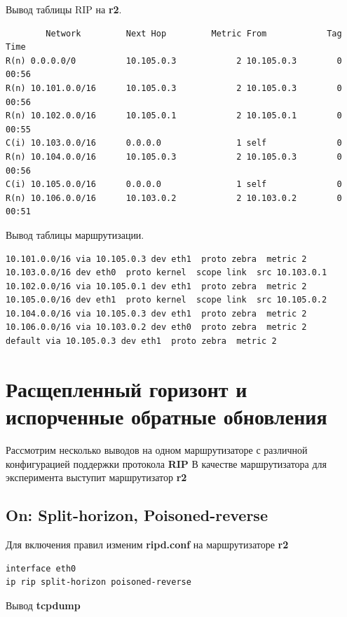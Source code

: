 \documentclass[a4paper,12pt]{article}
\begin{document}
Вывод таблицы RIP на \textbf{r2}.

\begin{Verbatim}
        Network         Next Hop         Metric From            Tag Time
R(n) 0.0.0.0/0          10.105.0.3            2 10.105.0.3        0 00:56
R(n) 10.101.0.0/16      10.105.0.3            2 10.105.0.3        0 00:56
R(n) 10.102.0.0/16      10.105.0.1            2 10.105.0.1        0 00:55
C(i) 10.103.0.0/16      0.0.0.0               1 self              0
R(n) 10.104.0.0/16      10.105.0.3            2 10.105.0.3        0 00:56
C(i) 10.105.0.0/16      0.0.0.0               1 self              0
R(n) 10.106.0.0/16      10.103.0.2            2 10.103.0.2        0 00:51    
\end{Verbatim}

Вывод таблицы маршрутизации.

\begin{Verbatim}
10.101.0.0/16 via 10.105.0.3 dev eth1  proto zebra  metric 2 
10.103.0.0/16 dev eth0  proto kernel  scope link  src 10.103.0.1 
10.102.0.0/16 via 10.105.0.1 dev eth1  proto zebra  metric 2 
10.105.0.0/16 dev eth1  proto kernel  scope link  src 10.105.0.2 
10.104.0.0/16 via 10.105.0.3 dev eth1  proto zebra  metric 2 
10.106.0.0/16 via 10.103.0.2 dev eth0  proto zebra  metric 2 
default via 10.105.0.3 dev eth1  proto zebra  metric 2     
\end{Verbatim}

\section{Расщепленный горизонт и испорченные обратные обновления}

Рассмотрим несколько выводов на одном маршрутизаторе с различной конфигурацией поддержки протокола \textbf{RIP}
В качестве маршрутизатора для эксперимента выступит маршрутизатор \textbf{r2}

\subsection{On: Split-horizon, Poisoned-reverse}
Для включения правил изменим \textbf{ripd.conf} на маршрутизаторе \textbf{r2}
\begin{verbatim}
interface eth0
ip rip split-horizon poisoned-reverse
\end{verbatim}

Вывод \textbf{tcpdump}
\end{document}
